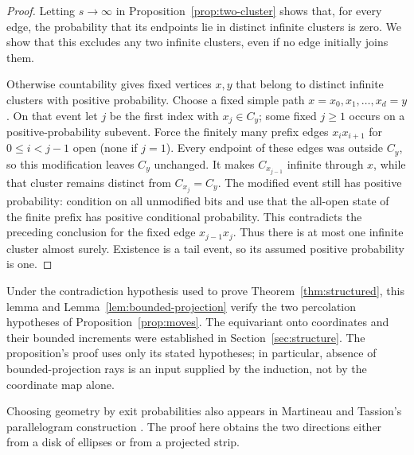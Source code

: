 \documentclass[11pt]{article}
\theoremstyle{definition}
\begin{document}
\begin{proof}
Letting $s\to\infty$ in Proposition~\ref{prop:two-cluster} shows that,
for every edge, the probability that its endpoints lie in distinct
infinite clusters is zero. We show that this excludes any two infinite
clusters, even if no edge initially joins them.

Otherwise countability gives fixed vertices $x,y$ that belong to
distinct infinite clusters with positive probability. Choose a fixed
simple path $x=x_0,x_1,\ldots,x_d=y$. On that event let $j$ be the
first index with $x_j\in C_y$; some fixed $j\ge1$ occurs on a
positive-probability subevent. Force the finitely many prefix edges
$x_ix_{i+1}$ for $0\le i<j-1$ open (none if $j=1$). Every endpoint of these edges
was outside $C_y$, so this modification leaves $C_y$ unchanged.
It makes $C_{x_{j-1}}$ infinite through $x$, while that cluster
remains distinct from $C_{x_j}=C_y$. The modified event still has
positive probability: condition on all unmodified bits and use that
the all-open state of the finite prefix has positive conditional
probability. This contradicts the preceding conclusion for the
fixed edge $x_{j-1}x_j$. Thus there is at most one infinite cluster
almost surely. Existence is a tail event, so its assumed positive
probability is one.
\end{proof}

Under the contradiction hypothesis used to prove
Theorem~\ref{thm:structured}, this lemma
and Lemma~\ref{lem:bounded-projection} verify the two percolation
hypotheses of Proposition~\ref{prop:moves}. The equivariant onto
coordinates and their bounded increments were established in
Section~\ref{sec:structure}. The proposition's proof uses only its
stated hypotheses; in particular, absence of bounded-projection rays
is an input supplied by the induction, not by the coordinate map alone.

Choosing geometry by exit probabilities also appears in Martineau and
Tassion's parallelogram construction
\cite[Section~3.2]{MartineauTassion2017}. The proof here obtains the two
directions either from a disk of ellipses or from a projected strip.
\end{document}
